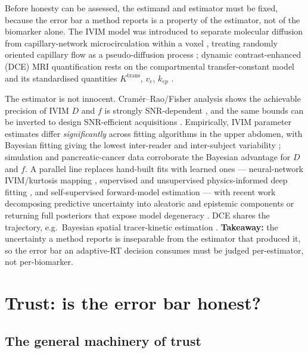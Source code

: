 \documentclass[review,number]{elsarticle}
\newcommand{\Ktrans}{K^{\mathrm{trans}}}
\begin{document}
Before honesty can be assessed, the estimand and estimator must be fixed, because the
error bar a method reports is a property of the estimator, not of the biomarker alone.
The IVIM model was introduced to separate molecular diffusion from capillary-network
microcirculation within a voxel \cite{lebihan1986,lebihan1988}, treating randomly
oriented capillary flow as a pseudo-diffusion process \cite{lebihan2019}; dynamic
contrast-enhanced (DCE) MRI quantification rests on the compartmental transfer-constant
model \cite{tofts1991} and its standardised quantities $\Ktrans$, $v_e$, $k_{ep}$
\cite{tofts1999}.

The estimator is not innocent. Cram\'er--Rao/Fisher analysis shows the achievable
precision of IVIM $D$ and $f$ is strongly SNR-dependent \cite{zhang2013}, and the same
bounds can be inverted to design SNR-efficient acquisitions \cite{jalnefjord2019}.
Empirically, IVIM parameter estimates differ \emph{significantly} across fitting
algorithms in the upper abdomen, with Bayesian fitting giving the lowest inter-reader
and inter-subject variability \cite{barbieri2016}; simulation \cite{while2017} and
pancreatic-cancer data \cite{gurneychampion2018} corroborate the Bayesian advantage for
$D$ and $f$. A parallel line replaces hand-built fits with learned ones ---
neural-network IVIM/kurtosis mapping \cite{bertleff2017}, supervised and unsupervised
physics-informed deep fitting \cite{barbieri2020,kaandorp2021}, and self-supervised
forward-model estimation \cite{vasylechko2021} --- with recent work decomposing
predictive uncertainty into aleatoric and epistemic components \cite{casali2025} or
returning full posteriors that expose model degeneracy \cite{jallais2024}. DCE
shares the trajectory, e.g.\ Bayesian spatial tracer-kinetic estimation
\cite{schmid2006}. \textbf{Takeaway:} the uncertainty a method reports is inseparable
from the estimator that produced it, so the error bar an adaptive-RT decision consumes
must be judged per-estimator, not per-biomarker.

\section{Trust: is the error bar honest?}
\label{sec:trust}

\subsection{The general machinery of trust}
\label{sec:trust-machinery}
\end{document}
